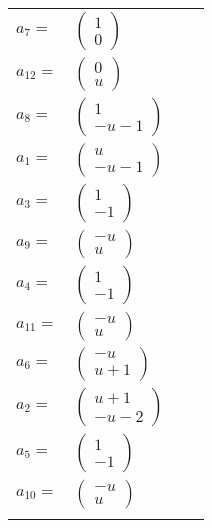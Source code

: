 \documentclass[1p]{elsarticle_modified}
\theoremstyle{definition}
\begin{document}
\begin{tabular}{m{7pt} m{180pt} m{7pt} m{180pt} }
\flushright $a_{7}=$&$\begin{pmatrix}1\\0\end{pmatrix}$ \\
\flushright $a_{12}=$&$\begin{pmatrix}0\\u\end{pmatrix}$ \\
\flushright $a_{8}=$&$\begin{pmatrix}1\\- u-1\end{pmatrix}$ \\
\flushright $a_{1}=$&$\begin{pmatrix}u\\- u-1\end{pmatrix}$ \\
\flushright $a_{3}=$&$\begin{pmatrix}1\\-1\end{pmatrix}$ \\
\flushright $a_{9}=$&$\begin{pmatrix}- u\\u\end{pmatrix}$ \\
\flushright $a_{4}=$&$\begin{pmatrix}1\\-1\end{pmatrix}$ \\
\flushright $a_{11}=$&$\begin{pmatrix}- u\\u\end{pmatrix}$ \\
\flushright $a_{6}=$&$\begin{pmatrix}- u\\u+1\end{pmatrix}$ \\
\flushright $a_{2}=$&$\begin{pmatrix}u+1\\- u-2\end{pmatrix}$ \\
\flushright $a_{5}=$&$\begin{pmatrix}1\\-1\end{pmatrix}$ \\
\flushright $a_{10}=$&$\begin{pmatrix}- u\\u\end{pmatrix}$\\&\end{tabular}
\end{document}
